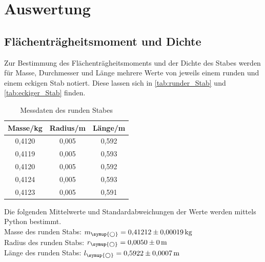 \section{Auswertung}
\label{sec:Auswertung}

\subsection{Flächenträgheitsmoment und Dichte}

  Zur Bestimmung des Flächenträgheitsmoments und der Dichte des Stabes werden für Masse, Durchmesser und Länge mehrere
  Werte von jeweils einem runden und einem eckigen Stab notiert. Diese lassen sich in \autoref{tab:runder_Stab} und \autoref{tab:eckiger_Stab} finden.

  \begin{table}
    \centering
    \caption{Messdaten des runden Stabes}
    \label{tab:runder_Stab}
    \begin{tabular}{c c c}
      \toprule
      Masse/kg & Radius/m & Länge/m \\
      \midrule
      0,4120 & 0,005 & 0,592 \\
      0,4119 & 0,005 & 0,593 \\
      0,4120 & 0,005 & 0,592 \\
      0,4124 & 0,005 & 0,593 \\
      0,4123 & 0,005 & 0,591 \\
      \bottomrule
    \end{tabular}
  \end{table}

  Die folgenden Mittelwerte und Standardabweichungen der Werte werden mittels Python bestimmt.\\
  Masse des runden Stabs: $m_{\symup{\bigcirc}} = 0{,}41212 \pm 0{,}00019 \, \mathrm{kg}$\\
  Radius des runden Stabs: $r_{\symup{\bigcirc}} = 0{,}0050 \pm 0 \, \mathrm{m}$\\
  Länge des runden Stabs: $l_{\symup{\bigcirc}} = 0{,}5922 \pm 0{,}0007 \, \mathrm{m}$\\


